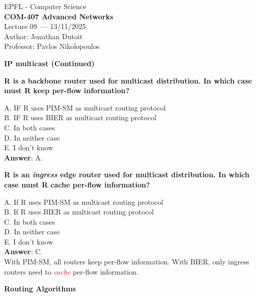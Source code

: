 \documentclass[11pt]{article}
\newcommand{\coursename}{COM-407 Advanced Networks}
\newcommand{\lecturenum}{09}
\newcommand{\lecturedate}{13/11/2025}
\newcommand{\professor}{Pavlos Nikolopoulos}
\begin{document}
\begin{center}
  {\large EPFL - Computer Science} \\[0.5em]
  {\Large \textbf{\coursename}} \\[0.5em]
  {\large Lecture \lecturenum\ --- \lecturedate} \\[0.5em]
  {\large Author: Jonathan Dutoit} \\[0.5em]
  {\large Professor: \professor} \\[0.5em]
\end{center}

\vspace{2cm}
\begin{center}
  {\LARGE \textbf{IP multicast (Continued)}}
\end{center}

\vspace{1cm}

\begin{tcolorbox}[
  colback=gray!15,     %
  colframe=black!50,    %
  boxrule=1pt,       %
  arc=3mm,             %
  left=4mm, right=4mm, top=2mm, bottom=2mm %
]
\textbf{R is a backbone router used for multicast distribution. In which case must R keep per-flow information?}

\vspace{0.3cm}

A. IF R uses PIM-SM as multicast routing protocol \\
B. IF R uses BIER as multicast routing protocol \\
C. In both cases \\
D. In neither case \\
E. I don't know \\

\textbf{Answer}: A. 
\end{tcolorbox}

\begin{tcolorbox}[
  colback=gray!15,     %
  colframe=black!50,    %
  boxrule=1pt,       %
  arc=3mm,             %
  left=4mm, right=4mm, top=2mm, bottom=2mm %
]
\textbf{R is an \textit{ingress} edge router used for multicast distribution. In which case must R cache per-flow information?}

\vspace{0.3cm}
A. If R uses PIM-SM as multicast routing protocol \\
B. If R uses BIER as multicast routing protocol \\ 
C. In both cases \\
D. In neither case \\
E. I don't know \\

\textbf{Answer}: C. \\
With PIM-SM, all routers keep per-flow information. With BIER, only ingress routers need to \textit{\textcolor{red}{cache}} per-flow information.
\end{tcolorbox}
\newpage
\begin{center}
  {\LARGE \textbf{Routing Algorithms}}
\end{center}
\end{document}
